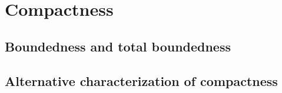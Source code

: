 \section{Compactness}

\subsection{Boundedness and total boundedness}

\subsection{Alternative characterization of compactness}
